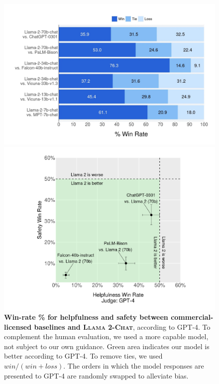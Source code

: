 \documentclass{article}
\newcommand{\modelname}{\textsc{Llama 2-Chat}\xspace}
\begin{document}
\begin{figure}[t]
   \begin{minipage}[t]{0.55\textwidth}
     \centering
     \includegraphics[width=0.99\linewidth]{img/human_evals/overall_win_rate_horizontal_white.pdf}
     \caption{\textbf{Helpfulness human evaluation} results for \modelname compared to other open-source and closed-source models. Human raters compared model generations on \textasciitilde4k prompts consisting of both single and multi-turn prompts. The 95\% confidence intervals for this evaluation are between 1\% and 2\%. More details in Section~\ref{sec:detail_results}. While reviewing these results, it is important to note that human evaluations can be noisy due to limitations of the prompt set, subjectivity of the review guidelines, subjectivity of individual raters, and the inherent difficulty of comparing generations.}
    \label{fig:first_helpful_evals}
   \end{minipage}\hfill
   \begin{minipage}[t]{0.42\textwidth}
     \centering
     \includegraphics[width=0.8\linewidth]{img/fig1_gpt4_eval.pdf}
     \caption{\textbf{Win-rate \% for helpfulness and safety between commercial-licensed baselines and \modelname{}}, according to GPT-4. To complement the human evaluation, we used a more capable model, not subject to our own guidance. Green area indicates our model is better according to GPT-4. To remove ties, we used $win/(win+loss)$. The orders in which the model responses are presented to GPT-4 are randomly swapped to alleviate bias.}
     \label{Fig:Data2}
   \end{minipage}
\end{figure}
\end{document}
